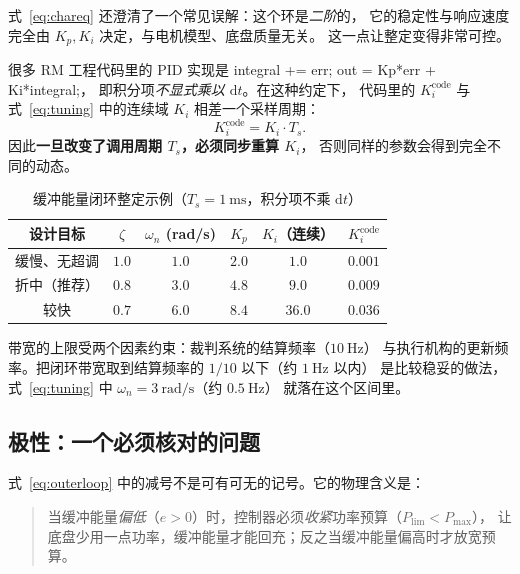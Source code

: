 \documentclass[cn,blue,11pt,device=normal]{elegantnote}
\newcommand{\code}[1]{{\ttfamily\small\def\_{\textunderscore\allowbreak}#1}}
\newcommand{\Plim}{P_{\mathrm{lim}}{}}
\newcommand{\Pmax}{P_{\max}{}}
\newcommand{\dd}{\mathrm{d}}
\newcommand{\fref}[1]{式~\eqref{#1}}
\begin{document}
\fref{eq:chareq} 还澄清了一个常见误解：这个环是\emph{二阶}的，
它的稳定性与响应速度完全由 $K_p,K_i$ 决定，与电机模型、底盘质量无关。
这一点让整定变得非常可控。

\begin{note}[关于积分项与采样周期]
很多 RM 工程代码里的 PID 实现是
\code{integral += err; out = Kp*err + Ki*integral;}，
即积分项\emph{不显式乘以 $\dd t$}。在这种约定下，
代码里的 $K_i^{\mathrm{code}}$ 与 \fref{eq:tuning} 中的连续域 $K_i$ 相差一个采样周期：
\begin{equation}
  K_i^{\mathrm{code}} = K_i\cdot T_s .
\end{equation}
因此\textbf{一旦改变了调用周期 $T_s$，必须同步重算 $K_i$}，
否则同样的参数会得到完全不同的动态。
\end{note}

\begin{table}[htbp]
  \centering
  \small
  \caption{缓冲能量闭环整定示例（$T_s = 1\ \mathrm{ms}$，积分项不乘 $\dd t$）}
  \label{tab:tuning}
  \begin{tabular}{@{}cccccc@{}}
    \toprule
    设计目标 & $\zeta$ & $\omega_n$ (rad/s) & $K_p$ & $K_i$（连续） & $K_i^{\mathrm{code}}$ \\
    \midrule
    缓慢、无超调 & $1.0$ & $1.0$  & $2.0$  & $1.0$  & $0.001$ \\
    折中（推荐） & $0.8$ & $3.0$  & $4.8$  & $9.0$  & $0.009$ \\
    较快 & $0.7$ & $6.0$  & $8.4$  & $36.0$ & $0.036$ \\
    \bottomrule
  \end{tabular}
\end{table}

带宽的上限受两个因素约束：裁判系统的结算频率（$10\ \mathrm{Hz}$）
与执行机构的更新频率。把闭环带宽取到结算频率的 $1/10$ 以下（约 $1\ \mathrm{Hz}$ 以内）
是比较稳妥的做法，\fref{eq:tuning} 中 $\omega_n=3\ \mathrm{rad/s}$（约 $0.5\ \mathrm{Hz}$）
就落在这个区间里。

\subsection{极性：一个必须核对的问题}

\fref{eq:outerloop} 中的减号不是可有可无的记号。它的物理含义是：

\begin{quote}
当缓冲能量\emph{偏低}（$e>0$）时，控制器必须\emph{收紧}功率预算（$\Plim<\Pmax$），
让底盘少用一点功率，缓冲能量才能回充；反之当缓冲能量偏高时才放宽预算。
\end{quote}
\end{document}
